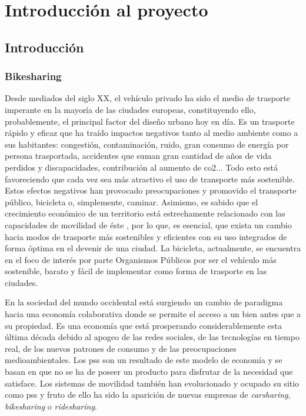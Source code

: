 \section{Introducción al proyecto}
\subsection{Introducción}
\subsubsection{Bikesharing}
Desde mediados del siglo XX, el vehículo privado ha sido el medio de trasporte imperante en la mayoría de las ciudades europeas, constituyendo ello, probablemente, el principal factor del diseño urbano hoy en día. Es un trasporte rápido y eficaz que ha traído impactos negativos tanto al medio ambiente como a sus habitantes: congestión, contaminación, ruido, gran consumo de energía por persona trasportada, accidentes que suman gran cantidad de años de vida perdidos y discapacidades, contribución al aumento de \acrshort{co2}... Todo esto está favoreciendo que cada vez sea más atractivo el uso de transporte más sostenible. Estos efectos negativos han provocado preocupaciones y promovido el transporte público, bicicleta o, simplemente, caminar. Asimismo, es sabido que el crecimiento económico de un territorio está estrechamente relacionado con las capacidades de movilidad de éste \cite{europe}, por lo que, es esencial, que exista un cambio hacia modos de trasporte más sostenibles y eficientes con su uso integrados de forma óptima en el devenir de una ciudad. La bicicleta, actualmente, se encuentra en el foco de interés por parte Organismos Públicos por ser el vehículo más sostenible, barato y fácil de implementar como forma de trasporte en las ciudades.
\newline

En la sociedad del mundo occidental está surgiendo un cambio de paradigma hacia una economía colaborativa donde se permite el acceso a un bien antes que a su propiedad. Es una economía que está prosperando considerablemente esta última década debido al apogeo de las redes sociales, de las tecnologías en tiempo real, de los nuevos patrones de consumo y de las preocupaciones medioambientales. Los \acrfull{pss} son un resultado de este modelo de economía y se basan en que no se ha de poseer un producto para disfrutar de la necesidad que satisface. Los sistemas de movilidad también han evolucionado y ocupado su sitio como \acrshort{pss} y fruto de ello ha sido la aparición de nuevas empresas de \textit{carsharing}, \textit{bikesharing} o \textit{ridesharing}.
\newline

